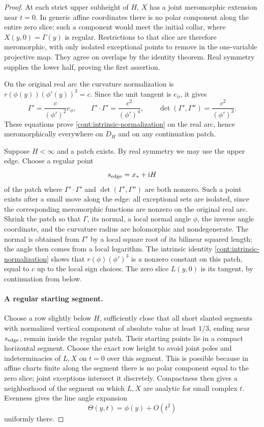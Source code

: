 \begin{proof}
At each strict upper subheight of \(H\), \(X\) has a joint
meromorphic extension near \(t=0\).  In generic affine
coordinates there is no polar component along the entire
zero slice: such a component would meet the initial
collar, where \(X(y,0)=\Gamma(y)\) is regular.
Restrictions to that slice are therefore meromorphic,
with only isolated exceptional points to remove in the
one-variable projective map.  They agree on overlaps by
the identity theorem.  Real symmetry supplies the lower
half, proving the first assertion.

On the original real arc the curvature normalization is
\(r(\phi(y))(\phi'(y))^3=c\).  Since the unit tangent is
\(e_\phi\), it gives
\[
 \Gamma'=\frac{c}{(\phi')^2}e_\phi,\qquad
 \Gamma'\cdot\Gamma'=\frac{c^2}{(\phi')^4},\qquad
 \det(\Gamma',\Gamma'')=\frac{c^2}{(\phi')^3}.
\]
These equations prove \eqref{cont:intrinsic-normalization}
on the real arc, hence meromorphically everywhere on
\(D_H\) and on any continuation patch.

Suppose \(H<\infty\) and a patch exists.  By real symmetry
we may use the upper edge.  Choose a regular point
\[
 s_{\rm edge}=x_*+\mathrm i H
\]
of the patch where \(\Gamma'\cdot\Gamma'\) and
\(\det(\Gamma',\Gamma'')\) are both nonzero.  Such a point
exists after a small move along the edge: all exceptional
sets are isolated, since the corresponding meromorphic
functions are nonzero on the original real arc.
Shrink the patch so that \(\Gamma\), its normal, a local
normal angle \(\phi\), the inverse angle coordinate, and
the curvature radius are holomorphic and nondegenerate.
The normal is obtained from \(\Gamma'\) by a local square
root of its bilinear squared length; the angle then
comes from a local logarithm.  The intrinsic identity
\eqref{cont:intrinsic-normalization} shows that
\(r(\phi)(\phi')^3\) is a nonzero constant on this patch,
equal to \(c\) up to the local sign choices.  The zero
slice \(L(y,0)\) is its tangent, by continuation from below.

\paragraph{A regular starting segment.}
Choose a row slightly below \(H\), sufficiently close
that all short slanted segments with normalized vertical
component of absolute value at least \(1/3\), ending near
\(s_{\rm edge}\), remain inside the regular patch.  Their
starting points lie in a compact horizontal segment.
Choose the exact row height to avoid joint poles and
indeterminacies of \(L,X\) on \(t=0\) over this segment.
This is possible because in affine charts finite along
the segment there is no polar component equal to the
zero slice; joint exceptions intersect it discretely.
Compactness then gives a neighborhood of the segment
on which \(L,X\) are analytic for small complex \(t\).
Evenness gives the line angle expansion
\begin{equation}
 \Theta(y,t)=\phi(y)+O(t^2)
 \label{cont:patch-angle-expansion}
\end{equation}
uniformly there.


\end{proof}
